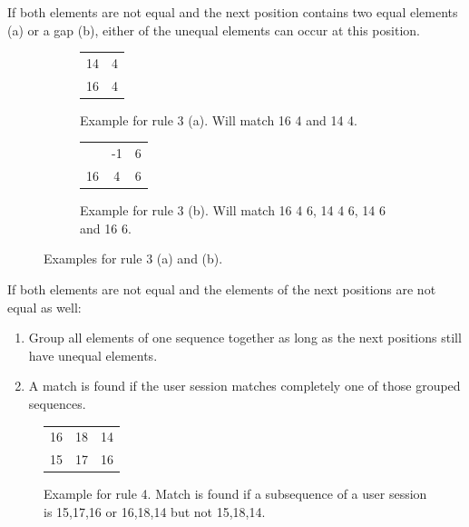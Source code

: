 	\begin{rules}
	\item If both elements are not equal and the next position contains two equal elements (a) or a gap (b), either of the unequal elements can occur at this position.
	\end{rules}
	\begin{figure}[h]
		\centering
		\begin{subfigure}[b]{0.49\textwidth}
		\centering
			\begin{tabular}{cc}
				 14 & 4\\
				 16 & 4\\
			\end{tabular}
			\caption{Example for rule 3 (a). Will match 16 4 and 14 4.}
			\label{fig:rule3}
		\end{subfigure}
		\begin{subfigure}[b]{0.49\textwidth}
		\centering
			\begin{tabular}{ccc}
		\centering
				14 & -1 & 6\\
				16 & 4  & 6 \\
			\end{tabular}
			\caption{Example for rule 3 (b). Will match 16 4 6, 14 4 6, 14 6 and 16 6. }
		\end{subfigure}
		\caption{Examples for rule 3 (a) and (b).}
		\label{fig:rule3}
	\end{figure}
	\begin{rules}
	\item If both elements are not equal and the elements of the next positions are not equal as well:
		\begin{enumerate}
			\item Group all elements of one sequence together as long as the next positions still have unequal elements.
			\item A match is found if the user session matches completely one of those grouped sequences.
		\end{enumerate}
	\end{rules}
	\begin{figure}[h]
	\centering
	\begin{tabular}{ccc}
		 16 & 18 & 14 \\
		 15 & 17 & 16 \\
	\end{tabular}
	\caption{Example for rule 4. Match is found if a subsequence of a user session is 15,17,16 or 16,18,14 but not 15,18,14.}
	\label{fig:rule4}
	\end{figure}

